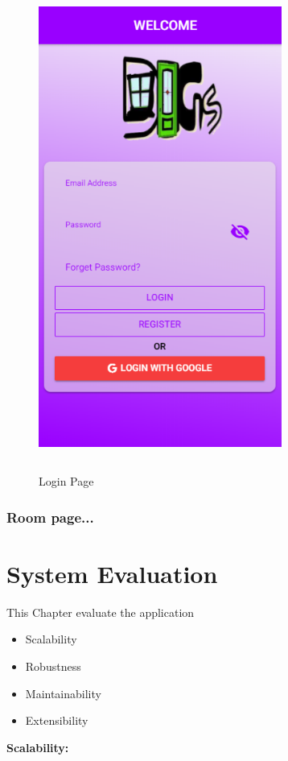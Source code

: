 \begin{figure}[h]
\centering
\includegraphics[width=8cm, height=16cm]{img/loginScreen}
\caption{Login Page}
\end{figure}

\subsection{Room page...}


\chapter{System Evaluation}
This Chapter evaluate the application
\begin{itemize}
    \item Scalability
    \item Robustness
    \item Maintainability
    \item Extensibility
\end{itemize}

\par \textbf{Scalability:} 

